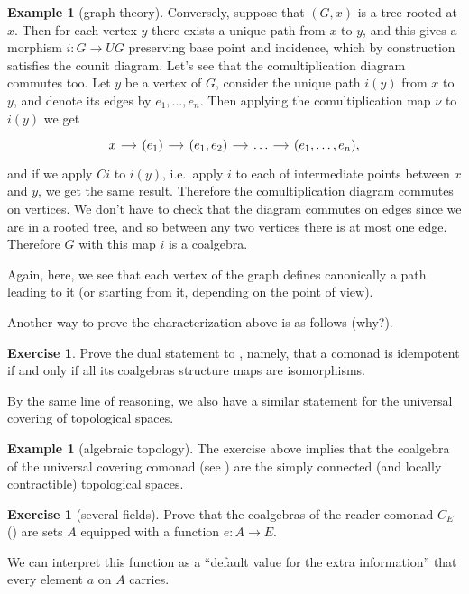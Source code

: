 \documentclass[a4paper,11pt,oneside]{scrbook}
\numberwithin{equation}{section}
\theoremstyle{plain}
\theoremstyle{definition}
\newtheorem{eg}[thm]{Example}
\newtheorem{ex}[thm]{Exercise}
\newcommand{\ar}[2][]{\arrow{#2}{#1}}
\DeclareMathOperator{\1}{\mathbbm{1}}
\DeclareMathOperator{\2}{\mathbbm{2}}
\begin{document}
\begin{eg}[graph theory]
 Conversely, suppose that $(G,x)$ is a tree rooted at $x$. Then for each vertex $y$ there exists a unique path from $x$ to $y$, and this gives a morphism $i:G\to UG$ preserving base point and incidence, which by construction satisfies the counit diagram. Let's see that the comultiplication diagram commutes too. Let $y$ be a vertex of $G$, consider the unique path $i(y)$ from $x$ to $y$, and denote its edges by $e_1,\dots,e_n$. Then applying the comultiplication map $\nu$ to $i(y)$ we get 
 $$
 \begin{tikzcd}[sep=small]
  x \ar{r} & (e_1) \ar{r} & (e_1,e_2) \ar{r} &\dots \ar{r} & (e_1,\dots,e_n) ,
 \end{tikzcd}
 $$
 and if we apply $Ci$ to $i(y)$, i.e.~apply $i$ to each of intermediate points between $x$ and $y$, we get the same result. Therefore the comultiplication diagram commutes on vertices.  
 We don't have to check that the diagram commutes on edges since we are in a rooted tree, and so between any two vertices there is at most one edge. Therefore $G$ with this map $i$ is a coalgebra.
\end{eg}

Again, here, we see that each vertex of the graph defines canonically a path leading to it (or starting from it, depending on the point of view).


Another way to prove the characterization above is as follows (why?).

\begin{ex}
 Prove the dual statement to , namely, that a comonad is idempotent if and only if all its coalgebras structure maps are isomorphisms. 
\end{ex}

By the same line of reasoning, we also have a similar statement for the universal covering of topological spaces.

\begin{eg}[algebraic topology]
 The exercise above implies that the coalgebra of the universal covering comonad (see ) are the simply connected (and locally contractible) topological spaces. 
\end{eg}


\begin{ex}[several fields]
 Prove that the coalgebras of the reader comonad $C_E$ () are sets $A$ equipped with a function $e:A\to E$. 
 
 We can interpret this function as a ``default value for the extra information'' that every element $a$ on $A$ carries.
\end{ex}
\end{document}
